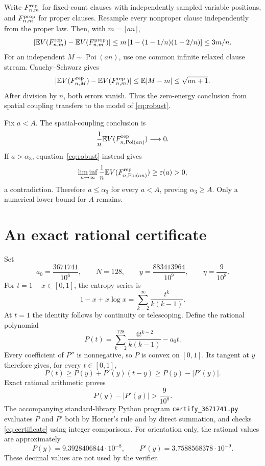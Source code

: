 \documentclass[11pt]{article}
\newcommand{\E}{\mathbb E}
\begin{document}
Write $F^{\rm rep}_{n,m}$ for fixed-count clauses with independently
sampled variable positions, and $F^{\rm prop}_{n,m}$ for proper clauses.
Resample every nonproper clause independently from the proper law.
Then, with $m=\lfloor an\rfloor$,
\begin{equation}\label{eq:proper}
 |\E V(F^{\rm rep}_{n,m})-\E V(F^{\rm prop}_{n,m})|
 \le m\left[1-(1-1/n)(1-2/n)\right]\le3m/n.
\end{equation}
For an independent $M\sim\operatorname{Poi}(an)$, use one common
infinite relaxed clause stream. Cauchy--Schwarz gives
\begin{equation}\label{eq:poisson}
 |\E V(F^{\rm rep}_{n,M})-\E V(F^{\rm rep}_{n,m})|
 \le\E|M-m|\le\sqrt{an+1}.
\end{equation}
After division by $n$, both errors vanish. Thus the zero-energy
conclusion from spatial coupling transfers to the model of
\eqref{eq:robust}.

Fix $a<A$. The spatial-coupling conclusion is
\[
 \frac1n\E V(F^{\rm rep}_{n,\operatorname{Poi}(an)})\longrightarrow0.
\]
If $a>\alpha_3$, equation~\eqref{eq:robust} instead gives
\[
 \liminf_{n\to\infty}\frac1n
       \E V(F^{\rm rep}_{n,\operatorname{Poi}(an)})
 \ge\varepsilon(a)>0,
\]
a contradiction. Therefore $a\le\alpha_3$ for every $a<A$, proving
$\alpha_3\ge A$. Only a numerical lower bound for $A$ remains.

\section{An exact rational certificate}
Set
\[
 a_0=\frac{3671741}{10^6},\qquad N=128,\qquad
 y=\frac{883413964}{10^9},\qquad \eta=\frac9{10^8}.
\]
For $t=1-x\in[0,1]$, the entropy series is
\[
 1-x+x\log x
 =\sum_{k=2}^{\infty}\frac{t^k}{k(k-1)}.
\]
At $t=1$ the identity follows by continuity or telescoping.
Define the rational polynomial
\[
 P(t)=\sum_{k=2}^{128}\frac{4t^{k-2}}{k(k-1)}-a_0t.
\]
Every coefficient of $P''$ is nonnegative, so $P$ is convex on $[0,1]$.
Its tangent at $y$ therefore gives, for every $t\in[0,1]$,
\[
 P(t)\ge P(y)+P'(y)(t-y)\ge P(y)-|P'(y)|.
\]
Exact rational arithmetic proves
\begin{equation}\label{eq:certificate}
 \boxed{P(y)-|P'(y)|>\frac9{10^8}.}
\end{equation}
The accompanying standard-library Python program
\texttt{certify\_3671741.py} evaluates $P$ and $P'$ both by Horner's
rule and by direct summation, and checks \eqref{eq:certificate} using
integer comparisons. For orientation only, the rational values are
approximately
\[
 P(y)=9.3928406844\cdot10^{-8},\qquad
 P'(y)=3.7588568378\cdot10^{-9}.
\]
These decimal values are not used by the verifier.
\end{document}
